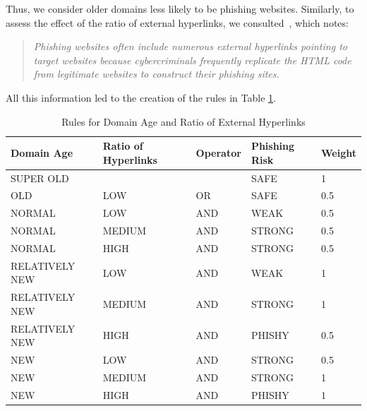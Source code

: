 \documentclass[11pt]{article}
\begin{document}
Thus, we consider older domains less likely to be phishing websites. Similarly, to assess the effect of the ratio of external hyperlinks, we consulted~\cite{externalhyperlinks}, which notes:

\begin{quote}
\textit{Phishing websites often include numerous external hyperlinks pointing to target websites because cybercriminals frequently replicate the HTML code from legitimate websites to construct their phishing sites.}
\end{quote}

All this information led to the creation of the rules in Table \ref{domainage_hyperlinks_rules}.

\begin{table}[H]
    \centering
    \begin{tabular}{|l|l|l|l|l|}
    \hline
    \textbf{Domain Age}     & \textbf{Ratio of Hyperlinks} & \textbf{Operator} & \textbf{Phishing Risk} & \textbf{Weight} \\ \hline
    SUPER OLD      &                     &                   & SAFE                   & 1               \\ \hline
    OLD            & LOW                 & OR                & SAFE                   & 0.5             \\ \hline
    NORMAL         & LOW                 & AND               & WEAK                   & 0.5             \\ \hline
    NORMAL         & MEDIUM              & AND               & STRONG                 & 0.5             \\ \hline
    NORMAL         & HIGH                & AND               & STRONG                 & 0.5             \\ \hline
    RELATIVELY NEW & LOW                 & AND               & WEAK                   & 1               \\ \hline
    RELATIVELY NEW & MEDIUM              & AND               & STRONG                 & 1               \\ \hline
    RELATIVELY NEW & HIGH                & AND               & PHISHY                 & 0.5             \\ \hline
    NEW            & LOW                 & AND               & STRONG                 & 0.5             \\ \hline
    NEW            & MEDIUM              & AND               & STRONG                 & 1               \\ \hline
    NEW            & HIGH                & AND               & PHISHY                 & 1               \\ \hline
    \end{tabular}
    \caption{Rules for Domain Age and Ratio of External Hyperlinks}
    \label{domainage_hyperlinks_rules}
\end{table}
\end{document}
